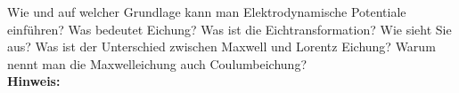 \begin{question}[section=5,subsection=51,name={Elektrodynamische Potentiale},difficulty=8,type=mdl,mode=exm,tags={}]
	Wie und auf welcher Grundlage kann man Elektrodynamische Potentiale einführen? Was bedeutet Eichung? Was ist die Eichtransformation? Wie sieht Sie aus? Was ist der Unterschied zwischen Maxwell und Lorentz Eichung? Warum nennt man die Maxwelleichung auch Coulumbeichung?
	\\ \textbf{Hinweis:}\\
	
\end{question}
\begin{solution}
	
\end{solution}